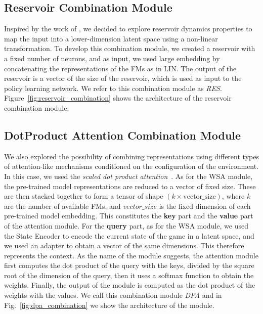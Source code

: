 \subsection{Reservoir Combination Module}
\label{subsec:reservoir_combination}
Inspired by the work of \citet{gallicchio2017}, we decided to explore reservoir dynamics properties to map the input into a lower-dimension latent space using a non-linear transformation.
To develop this combination module, we created a reservoir with a fixed number of neurons, and as input, we used large embedding by concatenating the representations of the FMs as in LIN\@.
The output of the reservoir is a vector of the size of the reservoir, which is used as input to the policy learning network.
We refer to this combination module as \textit{RES}.
Figure~\ref{fig:reservoir_combination} shows the architecture of the reservoir combination module.

\subsection{DotProduct Attention Combination Module}
\label{subsec:dpa}

We also explored the possibility of combining representations using different types of attention-like mechanisms conditioned on the configuration of the environment.
In this case, we used the \textit{scaled dot product attention}~\citep{vaswani2017attention}.
As for the WSA module, the pre-trained model representations are reduced to a vector of fixed size.
These are then stacked together to form a tensor of shape $(k \times \text{vector\_size})$, where $k$ are the number of available FMs, and $vector\_size$ is the fixed dimension of each pre-trained model embedding.
This constitutes the \textbf{key} part and the \textbf{value} part of the attention module.
For the \textbf{query} part, as for the WSA module, we used the State Encoder to encode the current state of the game in a latent space, and we used an adapter to obtain a vector of the same dimensions.
This therefore represents the context.
As the name of the module suggests, the attention module first computes the dot product of the query with the keys, divided by the square root of the dimension of the query, then it uses a softmax function to obtain the weights.
Finally, the output of the module is computed as the dot product of the weights with the values.
We call this combination module \textit{DPA} and in Fig.~\ref{fig:dpa_combination} we show the architecture of the module.


